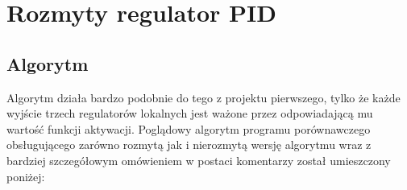 \FloatBarrier

\section {Rozmyty regulator PID}

\subsection{Algorytm}

Algorytm działa bardzo podobnie do tego z projektu pierwszego, tylko że każde wyjście trzech regulatorów lokalnych jest ważone przez odpowiadającą mu wartość funkcji aktywacji. Poglądowy algorytm programu porównawczego obsługującego zarówno rozmytą jak i nierozmytą wersję algorytmu wraz z bardziej szczegółowym omówieniem w postaci komentarzy został umieszczony poniżej:



